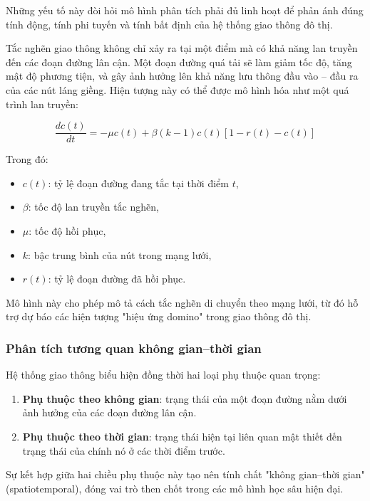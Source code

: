 Những yếu tố này đòi hỏi mô hình phân tích phải đủ linh hoạt để phản ánh đúng tính động, tính phi tuyến và tính bất định của hệ thống giao thông đô thị.


Tắc nghẽn giao thông không chỉ xảy ra tại một điểm mà có khả năng lan truyền đến các đoạn đường lân cận. Một đoạn đường quá tải sẽ làm giảm tốc độ, tăng mật độ phương tiện, và gây ảnh hưởng lên khả năng lưu thông đầu vào -- đầu ra của các nút láng giềng. Hiện tượng này có thể được mô hình hóa như một quá trình lan truyền:

\begin{equation}
\frac{dc(t)}{dt} = -\mu c(t) + \beta(k-1)c(t)[1-r(t)-c(t)]
\end{equation}

Trong đó:
\begin{itemize}
    \item $c(t)$: tỷ lệ đoạn đường đang tắc tại thời điểm $t$,
    \item $\beta$: tốc độ lan truyền tắc nghẽn,
    \item $\mu$: tốc độ hồi phục,
    \item $k$: bậc trung bình của nút trong mạng lưới,
    \item $r(t)$: tỷ lệ đoạn đường đã hồi phục.
\end{itemize}

Mô hình này cho phép mô tả cách tắc nghẽn di chuyển theo mạng lưới, từ đó hỗ trợ dự báo các hiện tượng "hiệu ứng domino" trong giao thông đô thị.

\subsubsection{Phân tích tương quan không gian--thời gian}

Hệ thống giao thông biểu hiện đồng thời hai loại phụ thuộc quan trọng: 
\begin{enumerate}
    \item \textbf{Phụ thuộc theo không gian}: trạng thái của một đoạn đường nằm dưới ảnh hưởng của các đoạn đường lân cận.
    \item \textbf{Phụ thuộc theo thời gian}: trạng thái hiện tại liên quan mật thiết đến trạng thái của chính nó ở các thời điểm trước.
\end{enumerate}

Sự kết hợp giữa hai chiều phụ thuộc này tạo nên tính chất "không gian--thời gian" (spatiotemporal), đóng vai trò then chốt trong các mô hình học sâu hiện đại.

